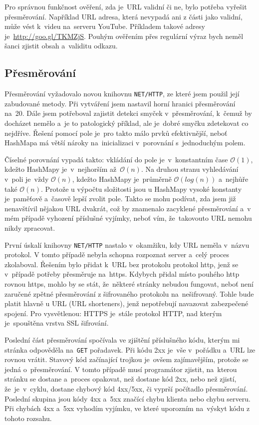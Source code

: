 \par Pro správnou funkčnost ověření, zda je~URL validní či ne, bylo potřeba vyřešit přesměrování. Například URL adresa, která nevypadá ani z části jako validní, může vést k~videu na~serveru YouTube. Příkladem takové adresy je~\url{http://goo.gl/TKMZjS}. Pouhým ověřením přes regulární výraz bych neměl šanci zjistit obsah a~validitu odkazu. 

\subsection{Přesměrování}
\par Přesměrování\cite{nethttp} vyžadovalo novou knihovnu \texttt{NET/HTTP}, ze které jsem použil její zabudované metody. Při vytváření jsem nastavil horní hranici přesměrování na~20. Dále jsem potřeboval zajistit detekci smyček v~přesměrování, k~čemuž by docházet nemělo a~je to patologický příklad, ale je~dobré smyčku zdetekovat co nejdříve. Řešení pomocí pole je~pro takto málo prvků efektivnější, neboť HashMapa má větší nároky na~inicializaci v~porovnání s~jednoduchým polem. 
\par Číselné porovnání vypadá takto: vkládání do pole je~v~konstantním čase $\mathcal{O}(1)$, kdežto HashMapy je~v~nejhorším až~$\mathcal{O}(n)$. Na druhou stranu vyhledávání v~poli je~vždy $\mathcal{O}(n)$, kdežto HashMapy je~průměrně $\mathcal{O}(log(n))$ a~nejhůře také $\mathcal{O}(n)$. Protože u výpočtu složitosti jsou u HashMapy vysoké konstanty je~paměťově a~časově lepší zvolit pole. Takto se mohu podívat, zda jsem již nenavštívil nějakou URL dvakrát, což by znamenalo zacyklené přesměrování a~v mém případě vyhození příslušné vyjímky, neboť vím, že~takovouto URL nemohu nikdy zpracovat.

\par První úskalí knihovny \texttt{NET/HTTP}\cite{nethttp} nastalo v~okamžiku, kdy URL neměla v~názvu protokol. V tomto případě nebyla schopna rozpoznat server a~celý proces zkolaboval. Řešením bylo přidat k~URL bez protokolu protokol http, jenž se v~případě potřeby přesměruje na~https. Kdybych přidal místo pouhého http rovnou https, mohlo by se stát, že~některé stránky nebudou fungovat, neboť není zaručené zpětné přesměrování z šifrovaného protokolu na~nešifrovaný. Tohle bude platit hlavně u  URL (URL shorteners), jenž nepotřebují navazovat zabezpečené spojení. Pro vysvětlenou: HTTPS je~stále protokol HTTP, nad kterým je~spouštěna vrstva SSL šifrování.
\par Poslední část přesměrování spočívala ve zjištění příslušného kódu, kterým mi stránka odpověděla na~\texttt{GET} pořadavek. Při kódu 2xx je~vše v~pořádku a~URL lze rovnou vrátit. Stavový kód začínající trojkou je~ovšem zajímavějším, protože se jedná o~přesměrování. V tomto případě musí programátor zjistit, na~kterou stránku se dostane a~proces opakovat, než dostane kód 2xx, nebo než zjistí, že~je~v~cyklu, dostane chybový kód 4xx/5xx, či vyprší počítadlo přesměrování. Poslední skupina jsou kódy 4xx a~5xx značící chybu klienta nebo chybu serveru. Při chybách 4xx a~5xx vyhodím vyjímku, ve které uporozním na~výskyt kódu z tohoto rozsahu.

